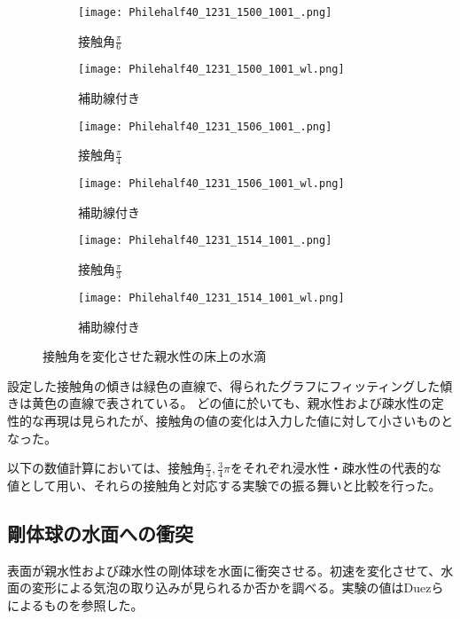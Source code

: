 \documentclass[]{jsarticle}
\begin{document}
\begin{figure}[H]
  \centering
  \begin{subfigure}{0.4\columnwidth}
    \centering
    \texttt{[image: Philehalf40\_1231\_1500\_1001\_.png]}
    \caption{接触角$\frac{\pi}{6}$}
    \label{fig:phile_pi6}
  \end{subfigure}
  \begin{subfigure}{0.4\columnwidth}
    \centering
    \texttt{[image: Philehalf40\_1231\_1500\_1001\_wl.png]}
    \caption{補助線付き}
    \label{fig:phile_pi6wl}
  \end{subfigure}

  \begin{subfigure}{0.4\columnwidth}
    \centering
    \texttt{[image: Philehalf40\_1231\_1506\_1001\_.png]}
    \caption{接触角$\frac{\pi}{4}$}
    \label{fig:phile_pi4}
  \end{subfigure}
  \begin{subfigure}{0.4\columnwidth}
    \centering
    \texttt{[image: Philehalf40\_1231\_1506\_1001\_wl.png]}
    \caption{補助線付き}
    \label{fig:phile_pi4wl}
  \end{subfigure}
  \begin{subfigure}{0.4\columnwidth}
    \centering
    \texttt{[image: Philehalf40\_1231\_1514\_1001\_.png]}
    \caption{接触角$\frac{\pi}{3}$}
    \label{fig:phile_pi3}
  \end{subfigure}
  \begin{subfigure}{0.4\columnwidth}
    \centering
    \texttt{[image: Philehalf40\_1231\_1514\_1001\_wl.png]}
    \caption{補助線付き}
    \label{fig:phile_pi3wl}
  \end{subfigure}

  \caption{接触角を変化させた親水性の床上の水滴}
\end{figure}

設定した接触角の傾きは緑色の直線で、得られたグラフにフィッティングした傾きは黄色の直線で表されている。
どの値に於いても、親水性および疎水性の定性的な再現は見られたが、接触角の値の変化は入力した値に対して小さいものとなった。

以下の数値計算においては、接触角$\frac{\pi}{4},\frac{3}{4}\pi$をそれぞれ浸水性・疎水性の代表的な値として用い、それらの接触角と対応する実験での振る舞いと比較を行った。


\newpage
\subsection{剛体球の水面への衝突}
表面が親水性および疎水性の剛体球を水面に衝突させる。初速を変化させて、水面の変形による気泡の取り込みが見られるか否かを調べる。実験の値はDuez\cite{Duez2007}らによるものを参照した。
\end{document}

